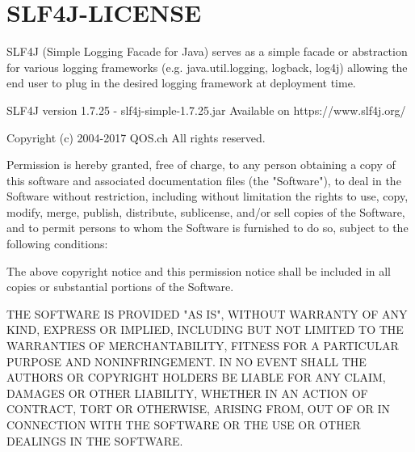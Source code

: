 \chapter{SLF4J-LICENSE} \label{SLF4J_LICENSE}

\parindent=0pt

\small

SLF4J (Simple Logging Facade for Java) serves as a simple facade or
abstraction for various logging frameworks (e.g. java.util.logging,
logback, log4j) allowing the end user to plug in the desired logging
framework at deployment time.

SLF4J version 1.7.25 - slf4j-simple-1.7.25.jar
Available on https://www.slf4j.org/

Copyright (c) 2004-2017 QOS.ch
All rights reserved.

Permission is hereby granted, free  of charge, to any person obtaining
a  copy  of this  software  and  associated  documentation files  (the
"Software"), to  deal in  the Software without  restriction, including
without limitation  the rights to  use, copy, modify,  merge, publish,
distribute,  sublicense, and/or sell  copies of  the Software,  and to
permit persons to whom the Software  is furnished to do so, subject to
the following conditions:

The  above  copyright  notice  and  this permission  notice  shall  be
included in all copies or substantial portions of the Software.

THE  SOFTWARE IS  PROVIDED  "AS  IS", WITHOUT  WARRANTY  OF ANY  KIND,
EXPRESS OR  IMPLIED, INCLUDING  BUT NOT LIMITED  TO THE  WARRANTIES OF
MERCHANTABILITY,    FITNESS    FOR    A   PARTICULAR    PURPOSE    AND
NONINFRINGEMENT. IN NO EVENT SHALL THE AUTHORS OR COPYRIGHT HOLDERS BE
LIABLE FOR ANY CLAIM, DAMAGES OR OTHER LIABILITY, WHETHER IN AN ACTION
OF CONTRACT, TORT OR OTHERWISE,  ARISING FROM, OUT OF OR IN CONNECTION
WITH THE SOFTWARE OR THE USE OR OTHER DEALINGS IN THE SOFTWARE.


